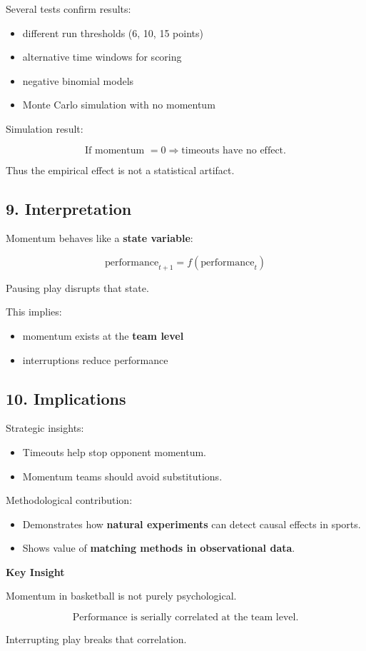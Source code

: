 \documentclass[11pt]{article}
\begin{document}
Several tests confirm results:

\begin{itemize}
		\item different run thresholds (6, 10, 15 points)
		\item alternative time windows for scoring
		\item negative binomial models
		\item Monte Carlo simulation with no momentum
\end{itemize}

Simulation result:

\[
		\text{If momentum } = 0
		\Rightarrow \text{timeouts have no effect}.
\]

Thus the empirical effect is not a statistical artifact.

\subsection*{9. Interpretation}

Momentum behaves like a \textbf{state variable}:

\[
		\text{performance}_{t+1}
		=
		f(\text{performance}_t)
\]

Pausing play disrupts that state.

This implies:

\begin{itemize}
		\item momentum exists at the \textbf{team level}
		\item interruptions reduce performance
\end{itemize}

\subsection*{10. Implications}

Strategic insights:

\begin{itemize}
		\item Timeouts help stop opponent momentum.
		\item Momentum teams should avoid substitutions.
\end{itemize}

Methodological contribution:

\begin{itemize}
		\item Demonstrates how \textbf{natural experiments} can detect causal effects in sports.
		\item Shows value of \textbf{matching methods in observational data}.
\end{itemize}

\bigskip

\textbf{Key Insight}

Momentum in basketball is not purely psychological.

\[
		\text{Performance is serially correlated at the team level.}
\]

Interrupting play breaks that correlation.
\end{document}
